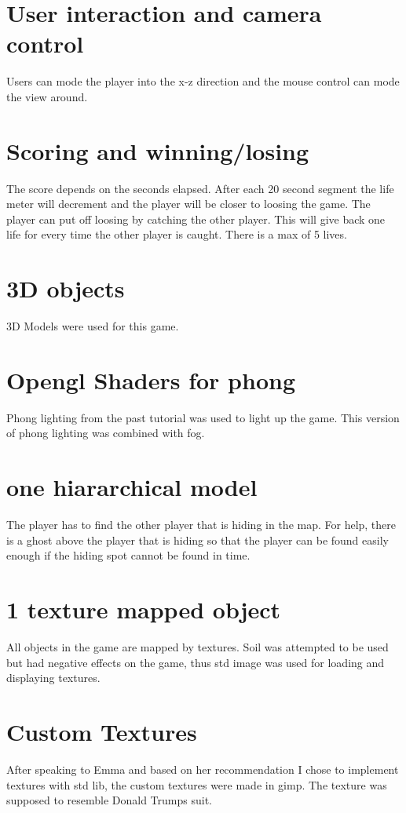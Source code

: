 \documentclass{article}
\begin{document}
\section{User interaction and camera control}
Users can mode the player into the x-z direction and the mouse control can mode the view around.



\section{Scoring and winning/losing}
The score depends on the seconds elapsed. After each 20 second segment the life meter will decrement and the player will be closer to loosing the game. The player can put off loosing by catching the other player. This will give back one life for every time the other player is caught. There is a max of 5 lives.
\section{3D objects}
3D Models were used for this game. 


\section{Opengl Shaders for phong}
Phong lighting from the past tutorial was used to light up the game. This version of phong lighting was combined with fog.



\section{one hiararchical model}
The player has to find the other player that is hiding in the map. For help, there is a ghost above the player that is hiding so that the player can be found easily enough if the hiding spot cannot be found in time.


\section{1 texture mapped object}
All objects in the game are mapped by textures. Soil was attempted to be used but had negative effects on the game, thus std image was used for loading and displaying textures.






\section{Custom Textures}
After speaking to Emma and based on her recommendation I chose to implement textures with std lib, the custom textures were made in gimp. The texture was supposed to resemble Donald Trumps suit.
\end{document}
